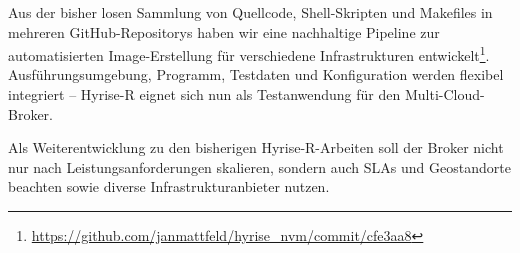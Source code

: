 Aus der bisher losen Sammlung von Quellcode, Shell-Skripten und Makefiles in mehreren GitHub-Repositorys haben wir eine nachhaltige Pipeline zur automatisierten Image-Erstellung für verschiedene Infrastrukturen entwickelt\footnote{\url{https://github.com/janmattfeld/hyrise_nvm/commit/cfe3aa8}}. Ausführungsumgebung, Programm, Testdaten und Konfiguration werden flexibel integriert -- Hyrise-R eignet sich nun als Testanwendung für den Multi-Cloud-Broker.

Als Weiterentwicklung zu den bisherigen Hyrise-R-Arbeiten soll der Broker nicht nur nach Leistungsanforderungen skalieren, sondern auch SLAs und Geostandorte beachten sowie diverse Infrastrukturanbieter nutzen.
